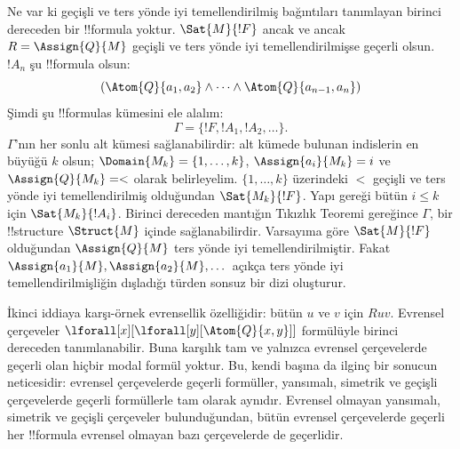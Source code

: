 \documentclass[../../../include/open-logic-section]{subfiles}
\begin{document}
Ne var ki geçişli ve ters yönde iyi temellendirilmiş bağıntıları tanımlayan
birinci dereceden bir !!{formula} yoktur. $\Sat{M}{!F}$ ancak ve ancak
$R=\Assign{Q}{M}$ geçişli ve ters yönde iyi temellendirilmişse geçerli
olsun. $!A_n$ şu !!{formula} olsun:
\[
(\Atom{Q}{a_1,a_2} \land \dots \land
    \Atom{Q}{a_{n-1},a_{n}})
\]
Şimdi şu !!{formula}s kümesini ele alalım:
\[
\Gamma=\{!F,!A_1,!A_2,\dots\}.
\]
$\Gamma$'nın her sonlu alt kümesi sağlanabilirdir: alt kümede bulunan
indislerin en büyüğü $k$ olsun; $\Domain{M_k}=\{1,\dots,k\}$,
$\Assign{a_i}{M_k}=i$ ve $\Assign{Q}{M_k}=<$ olarak belirleyelim.
$\{1,\dots,k\}$ üzerindeki $<$ geçişli ve ters yönde iyi temellendirilmiş
olduğundan $\Sat{M_k}{!F}$. Yapı gereği bütün $i\le k$ için
$\Sat{M_k}{!A_i}$. Birinci dereceden mantığın Tıkızlık Teoremi gereğince
$\Gamma$, bir !!{structure} $\Struct{M}$ içinde sağlanabilirdir. Varsayıma
göre $\Sat{M}{!F}$ olduğundan $\Assign{Q}{M}$ ters yönde iyi
temellendirilmiştir. Fakat $\Assign{a_1}{M},\Assign{a_2}{M},\dots$ açıkça
ters yönde iyi temellendirilmişliğin dışladığı türden sonsuz bir dizi
oluşturur.

İkinci iddiaya karşı-örnek evrensellik özelliğidir: bütün $u$ ve $v$ için
$Ruv$. Evrensel çerçeveler
$\lforall[x][\lforall[y][\Atom{Q}{x,y}]]$ formülüyle birinci dereceden
tanımlanabilir. Buna karşılık tam ve yalnızca evrensel çerçevelerde geçerli
olan hiçbir modal formül yoktur. Bu, kendi başına da ilginç bir sonucun
neticesidir: evrensel çerçevelerde geçerli formüller, yansımalı, simetrik ve
geçişli çerçevelerde geçerli formüllerle tam olarak aynıdır. Evrensel
olmayan yansımalı, simetrik ve geçişli çerçeveler bulunduğundan, bütün
evrensel çerçevelerde geçerli her !!{formula} evrensel olmayan bazı
çerçevelerde de geçerlidir.
\end{document}
